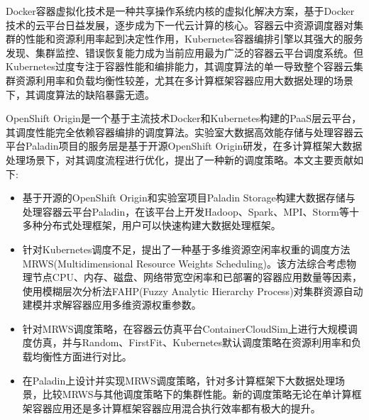 \begin{cabstract}
  Docker容器虚拟化技术是一种共享操作系统内核的虚拟化解决方案，基于Docker技术的云平台日益发展，逐步成为下一代云计算的核心。容器云中资源调度器对集群的性能和资源利用率起到决定性作用，Kubernetes容器编排引擎以其强大的服务发现、集群监控、错误恢复能力成为当前应用最为广泛的容器云平台调度系统。但Kubernetes过度专注于容器性能和编排能力，其调度算法的单一导致整个容器云集群资源利用率和负载均衡性较差，尤其在多计算框架容器应用大数据处理的场景下，其调度算法的缺陷暴露无遗。

OpenShift Origin是一个基于主流技术Docker和Kubernetes构建的PaaS层云平台，其调度性能完全依赖容器编排的调度算法。实验室大数据高效能存储与处理容器云平台Paladin项目的服务层是基于开源OpenShift Origin研发，在多计算框架大数据处理场景下，对其调度流程进行优化，提出了一种新的调度策略。本文主要贡献如下:
  \begin{itemize}
  \item 基于开源的OpenShift Origin和实验室项目Paladin Storage构建大数据存储与处理容器云平台Paladin，在该平台上开发Hadoop、Spark、MPI、Storm等十多种分布式处理框架，用户可以快速构建大数据处理框架。
  \item 针对Kubernetes调度不足，提出了一种基于多维资源空闲率权重的调度方法MRWS(Multidimensional Resource Weights Scheduling)。该方法综合考虑物理节点CPU、内存、磁盘、网络带宽空闲率和已部署的容器应用数量等因素，使用模糊层次分析法FAHP(Fuzzy Analytic Hierarchy Process)对集群资源自动建模并求解容器应用多维资源权重参数。
  \item 针对MRWS调度策略，在容器云仿真平台ContainerCloudSim上进行大规模调度仿真，并与Random、FirstFit、Kubernetes默认调度策略在资源利用率和负载均衡性方面进行对比。
  \item 在Paladin上设计并实现MRWS调度策略，针对多计算框架下大数据处理场景，比较MRWS与其他调度策略下的集群性能。新的调度策略无论在单计算框架容器应用还是多计算框架容器应用混合执行效率都有极大的提升。
  \end{itemize}
\end{cabstract}


